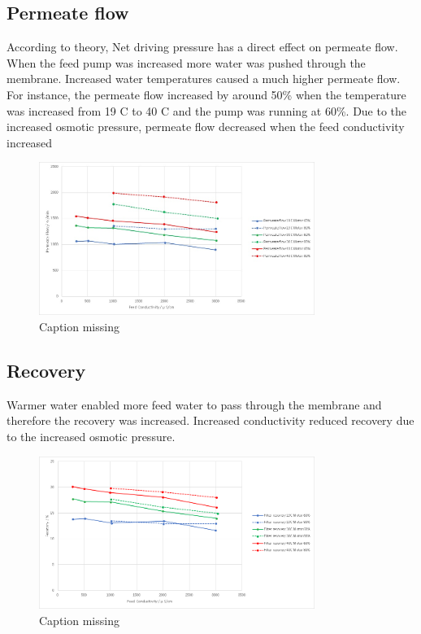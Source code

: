 \subsection{Permeate flow}

According to theory, Net driving pressure has a direct effect on permeate flow. When the feed pump was increased more water was pushed through the membrane. Increased water temperatures caused a much higher permeate flow. For instance, the permeate flow increased by around 50\% when the temperature was increased from 19 C to 40 C and the pump was running at 60\%. Due to the increased osmotic pressure, permeate flow decreased when the feed conductivity increased

\begin{figure}[H]
    \centering
    \includegraphics[width=0.8\textwidth]{permFlowCurrent}
    \caption{Caption missing}
    \label{fig:PressConn}
\end{figure}

\subsection{Recovery}

Warmer water enabled more feed water to pass through the membrane and therefore the recovery was increased. Increased conductivity reduced recovery due to the increased osmotic pressure.

\begin{figure}[H]
    \centering
    \includegraphics[width=0.8\textwidth]{Recovery}
    \caption{Caption missing}
    \label{fig:PressConn}
\end{figure}

